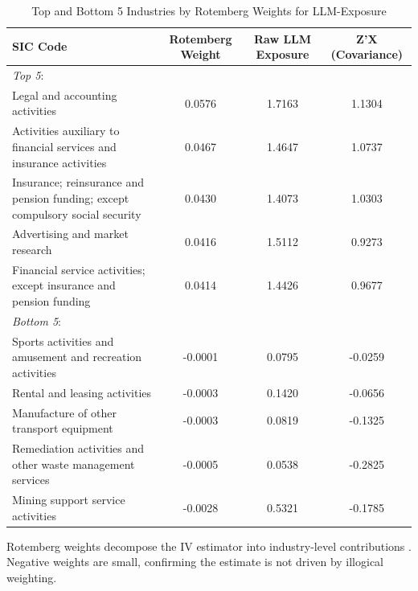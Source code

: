 \begin{table}[!htbp]

\caption{Top and Bottom 5 Industries by Rotemberg Weights for LLM-Exposure}
\centering
\begin{threeparttable}
\begin{tabular}[t]{p{6.7cm}ccc}
\toprule
SIC Code & Rotemberg Weight & Raw LLM Exposure & Z'X (Covariance)\\
\midrule
\textit{Top 5}: &&&\\
Legal and accounting activities
 & 0.0576 & 1.7163 & 1.1304\\
 Activities auxiliary to financial services and insurance activities
 & 0.0467 & 1.4647 & 1.0737\\
Insurance; reinsurance and pension funding; except compulsory social security
 & 0.0430 & 1.4073 & 1.0303\\
 Advertising and market research
 & 0.0416 & 1.5112 & 0.9273\\
Financial service activities; except insurance and pension funding
 & 0.0414 & 1.4426 & 0.9677\\
\addlinespace
\textit{Bottom 5}: &&&\\
Sports activities and amusement and recreation activities
 & -0.0001 & 0.0795 & -0.0259\\
Rental and leasing activities
& -0.0003 & 0.1420 & -0.0656\\
Manufacture of other transport equipment
 & -0.0003 & 0.0819 & -0.1325\\
Remediation activities and other waste management services
 & -0.0005 & 0.0538 & -0.2825\\
Mining support service activities
 & -0.0028 & 0.5321 & -0.1785\\
\bottomrule
\end{tabular}
\begin{tablenotes}
    \item Rotemberg weights decompose the IV estimator into industry-level contributions \citep{goldsmith2020bartik}. Negative weights are small, confirming the estimate is not driven by illogical weighting.
\end{tablenotes}
\end{threeparttable}
\label{llm_rotemberg}
\end{table}